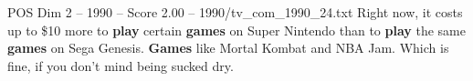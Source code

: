 \begin{textsample}{POS Dim 2 – 1990 – Score 2.00 – 1990/tv\_com\_1990\_24.txt}  \label{ex:f2_pos_033}
Right now, it costs up to \$10 more to \textbf{play} certain \textbf{games} on Super Nintendo than to \textbf{play} the same \textbf{games} on Sega Genesis. \textbf{Games} like Mortal Kombat and NBA Jam.
Which is fine, if you don't mind being sucked dry.

\end{textsample}
